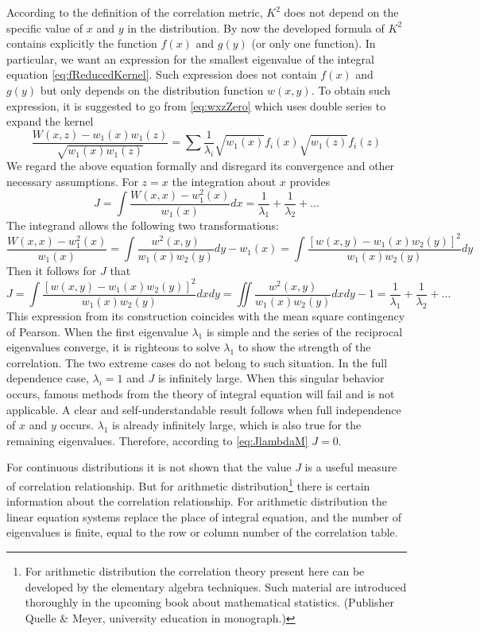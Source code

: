 \documentclass{article}
\begin{document}
According to the definition of the correlation metric,
$K^2$ does not depend on the specific value of $x$
and $y$ in the distribution.
By now the developed formula of $K^2$ contains explicitly
the function $f(x)$ and $g(y)$ (or only one function).
In particular, we want an expression for the smallest
eigenvalue of the integral equation \eqref{eq:fReducedKernel}.
Such expression does not contain $f(x)$ and
$g(y)$ but only depends on the distribution function
$w(x,y)$.
To obtain such expression, it is suggested to go from \eqref{eq:wxzZero}
which uses double series to expand the kernel
\begin{equation}
        \frac{W(x,z) - w_1(x) w_1(z)}{\sqrt{w_1(x)w_1(z)}}
    = \sum \frac{1}{\lambda_i}
    \sqrt{w_1(x)}f_i(x) \sqrt{w_1(z)}f_i(z) \tag{21}
\end{equation}
We regard the above equation formally and disregard
its convergence and other necessary assumptions.
For $z=x$ the integration about $x$ provides
$$
J = \int \frac{W(x,x) - w_1^2(x)}{w_1(x)} dx
= \frac{1}{\lambda_1}
+ \frac{1}{\lambda_2}
+ \dots
$$
The integrand allows the following two transformations:
$$
\frac{W(x,x) - w_1^2(x)}{w_1(x)}
= \int \frac{w^2(x,y)}{w_1(x)w_2(y)} dy - w_1(x)
=\int \frac{[w(x,y)-w_1(x)w_2(y)]^2}{w_1(x)w_2(y)} dy 
$$
Then it follows for $J$ that
\begin{equation}\label{eq:JlambdaM}
    J=\int \frac{[w(x,y)-w_1(x)w_2(y)]^2}{w_1(x)w_2(y)} dxdy
    = \iint  \frac{w^2(x,y)}{w_1(x)w_2(y)} dxdy-1
    = \frac{1}{\lambda_1}
+ \frac{1}{\lambda_2}
+ \dots
\end{equation}
This expression from its construction coincides with the mean square
contingency of Pearson.
When the first eigenvalue $\lambda_1$
is simple and the series of the reciprocal eigenvalues
converge, it is righteous to solve $\lambda_1$
to show the strength of the correlation.
The two extreme cases do not belong to such situation.
In the full dependence case, $\lambda_i=1$ and $J$
is infinitely large. When this singular behavior
occurs, famous methods from the theory of
integral equation will fail and is not applicable.
A clear and self-understandable result follows when full independence of $x$ and $y$
occurs. $\lambda_1$ is already infinitely large, which
is also true for the remaining eigenvalues. Therefore,
according to \eqref{eq:JlambdaM} $J=0$.

For continuous distributions it is not shown that the value $J$ is a useful
measure of correlation relationship.
But for arithmetic distribution\footnote{For arithmetic distribution
the correlation theory present here can be developed by the elementary
algebra techniques. Such material are introduced thoroughly in the upcoming book about mathematical
statistics. (Publisher Quelle \& Meyer, university education in monograph.)}
there is certain information about the correlation relationship. For arithmetic distribution
the linear equation systems replace the place of integral equation,
and the number of eigenvalues is finite, equal to the row or column
number of the correlation table.
\end{document}
